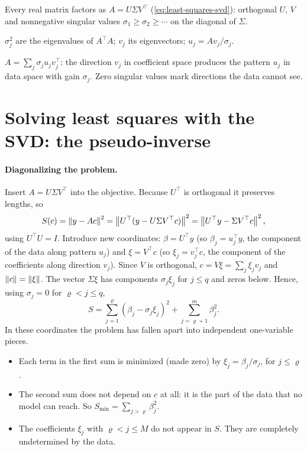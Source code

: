 \begin{keyideas}
\item Every real matrix factors as $A = U\Sigma V^\top$ (\cref{eq:least-squares-svd}): orthogonal $U$, $V$ and nonnegative singular values $\sigma_1\ge\sigma_2\ge\cdots$ on the diagonal of $\Sigma$.
\item $\sigma_j^2$ are the eigenvalues of $A^\top A$; $v_j$ its eigenvectors; $u_j = Av_j/\sigma_j$.
\item $A = \sum_j\sigma_ju_jv_j^\top$: the direction $v_j$ in coefficient space produces the pattern $u_j$ in data space with gain $\sigma_j$. Zero singular values mark directions the data cannot see.
\end{keyideas}

\section{Solving least squares with the SVD: the pseudo-inverse}\label{sec:least-squares-pinv}

\paragraph{Diagonalizing the problem.} Insert $A = U\Sigma V^\top$ into the objective. Because $U^\top$ is orthogonal it preserves lengths, so
\[
S(c) = \left\lVert y - Ac\right\rVert^2 = \left\lVert U^\top(y - U\Sigma V^\top c)\right\rVert^2 = \left\lVert U^\top y - \Sigma V^\top c\right\rVert^2 ,
\]
using $U^\top U = I$. Introduce new coordinates: $\beta = U^\top y$ (so $\beta_j = u_j^\top y$, the component of the data along pattern $u_j$) and $\xi = V^\top c$ (so $\xi_j = v_j^\top c$, the component of the coefficients along direction $v_j$). Since $V$ is orthogonal, $c = V\xi = \sum_j \xi_j v_j$ and $\left\lVert c\right\rVert = \left\lVert \xi\right\rVert$. The vector $\Sigma\xi$ has components $\sigma_j\xi_j$ for $j\le q$ and zeros below. Hence, using $\sigma_j = 0$ for $\varrho<j\le q$,
\begin{equation}
S = \sum_{j=1}^{\varrho} (\beta_j - \sigma_j\xi_j)^2 + \sum_{j=\varrho+1}^{m}\beta_j^2 .
\label{eq:least-squares-S-diag}
\end{equation}
In these coordinates the problem has fallen apart into independent one-variable pieces.
\begin{itemize}
\item Each term in the first sum is minimized (made zero) by $\xi_j = \beta_j/\sigma_j$, for $j\le\varrho$.
\item The second sum does not depend on $c$ at all: it is the part of the data that no model can reach. So $S_{\min} = \sum_{j>\varrho}\beta_j^2$.
\item The coefficients $\xi_j$ with $\varrho < j\le M$ do not appear in $S$. They are completely undetermined by the data.
\end{itemize}

